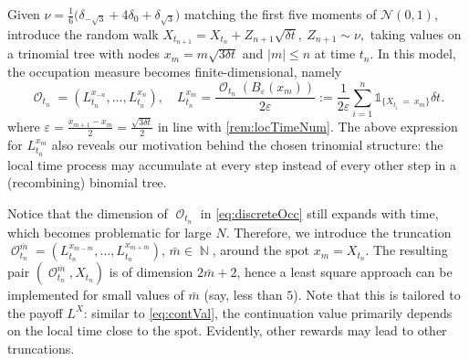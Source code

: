 \documentclass[11pt]{article}
\theoremstyle{plain}
\theoremstyle{definition}
\DeclareMathOperator{\N}{\mathbb{N}}
\DeclareMathOperator{\calO}{\mathcal{O}}
\begin{document}
 
Given %
$\nu = \frac{1}{6}\big(\delta_{-\sqrt{3}} + 4\delta_0 + \delta_{\sqrt{3}}\big)$ matching the first five moments of $\mathcal{N}(0,1)$, introduce the random walk 
$X_{t_{n+1}} = X_{t_n} + Z_{n+1} \sqrt{\delta t}, \ Z_{n+1} \sim \nu,$  
taking values on a  trinomial tree with nodes $x_{m} = m\sqrt{3\delta t }$  %
and   $|m| \le n$ at time $t_n$. 
In this model, the occupation measure  becomes finite-dimensional, namely 
\begin{equation}\label{eq:discreteOcc}
    \calO_{t_n} = (L_{t_n}^{x_{-n}}, \ldots, L_{t_n}^{x_{n}}), \quad L_{t_n}^{x_{m}} = \frac{\calO_{t_n}(B_{\varepsilon}(x_m))}{2\varepsilon} := \frac{1}{2\varepsilon}\sum_{i=1}^n  \mathds{1}_{\{X_{t_i} \ = \   x_m\}} \delta t.
\end{equation}
where $\varepsilon = \frac{x_{m+1}-x_m}{2} = \frac{\sqrt{3\delta t }}{2}$ in line with \cref{rem:locTimeNum}. %
The above expression for $L_{t_n}^{x_{m}}$
also reveals our  motivation behind the chosen  trinomial structure:  the local time process %
may accumulate at every step instead of every other step  in a (recombining) binomial tree.  

Notice that  the dimension of $\calO_{t_n}$ in \eqref{eq:discreteOcc} still expands with time, which becomes problematic for large $N$. Therefore,  we  introduce the truncation $\calO_{t_n}^{\bar{m}} = (L_{t_n}^{x_{m-\bar{m}}},\ldots, L_{t_n}^{x_{m+\bar{m}}} )$, $\bar{m} \in \N$, around the spot 
    $x_m = X_{t_n}$. The resulting pair $(\calO_{t_n}^{\bar{m}},X_{t_n})$ is of dimension $2\bar{m}+2$, hence a least square approach can be implemented for small values of $\bar{m}$ (say, less than $5$). 
Note that this is tailored to the payoff $L^X$: similar to \eqref{eq:contVal},   the continuation value primarily depends on the local time close to the spot. 
Evidently, other rewards may lead to other  truncations. 
\end{document}
